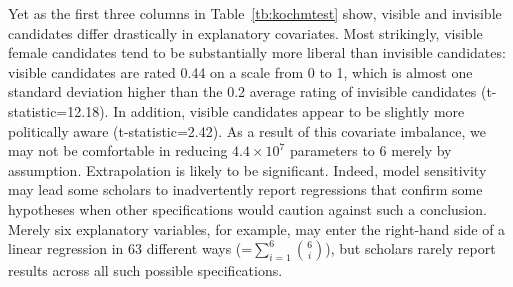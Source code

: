 \documentclass[11pt,titlepage]{article}
\begin{document}
Yet as the first three columns in Table~\ref{tb:kochmtest} show,
visible and invisible candidates differ drastically in explanatory
covariates.  Most strikingly, visible female candidates tend to be
substantially more liberal than invisible candidates: visible
candidates are rated 0.44 on a scale from 0 to 1, which is almost one
standard deviation higher than the 0.2 average rating of invisible
candidates (t-statistic=12.18).  In addition, visible candidates
appear to be slightly more politically aware (t-statistic=2.42).  As a
result of this covariate imbalance, we may not be comfortable in
reducing $4.4 \times 10^7$ parameters to 6 merely by assumption.
Extrapolation is likely to be significant.  Indeed, model sensitivity
may lead some scholars to inadvertently report regressions that
confirm some hypotheses when other specifications would caution
against such a conclusion.  Merely six explanatory variables, for
example, may enter the right-hand side of a linear regression in 63
different ways (=$\sum_{i=1}^6 {6 \choose i}$), but scholars rarely
report results across all such possible specifications.
\end{document}
